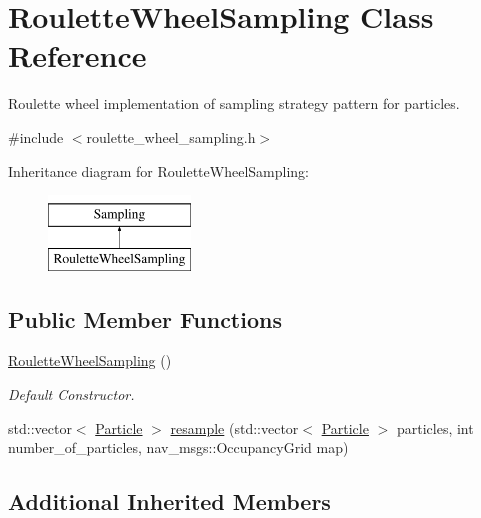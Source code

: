 \hypertarget{classRouletteWheelSampling}{\section{Roulette\-Wheel\-Sampling Class Reference}
\label{classRouletteWheelSampling}
}


Roulette wheel implementation of sampling strategy pattern for particles.  




{\ttfamily \#include $<$roulette\-\_\-wheel\-\_\-sampling.\-h$>$}

Inheritance diagram for Roulette\-Wheel\-Sampling\-:\begin{figure}[H]
\begin{center}
\leavevmode
\includegraphics[height=2.000000cm]{classRouletteWheelSampling}
\end{center}
\end{figure}
\subsection*{Public Member Functions}
\begin{DoxyCompactItemize}
\item 
\hypertarget{classRouletteWheelSampling_ae9f93de1a052e204198887e0a47a5a1c}{\hyperlink{classRouletteWheelSampling_ae9f93de1a052e204198887e0a47a5a1c}{Roulette\-Wheel\-Sampling} ()}\label{classRouletteWheelSampling_ae9f93de1a052e204198887e0a47a5a1c}

\begin{DoxyCompactList}\small\item\em Default Constructor. \end{DoxyCompactList}\item 
std\-::vector$<$ \hyperlink{classParticle}{Particle} $>$ \hyperlink{classRouletteWheelSampling_ad9634cbe5aa5b112c823d252a1497313}{resample} (std\-::vector$<$ \hyperlink{classParticle}{Particle} $>$ particles, int number\-\_\-of\-\_\-particles, nav\-\_\-msgs\-::\-Occupancy\-Grid map)
\end{DoxyCompactItemize}
\subsection*{Additional Inherited Members}


